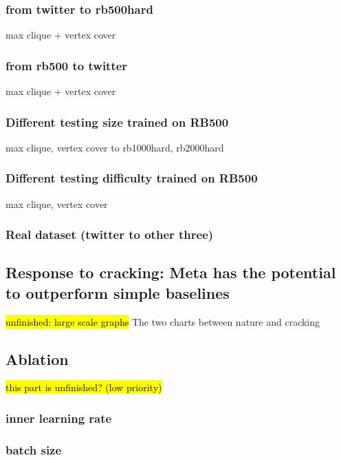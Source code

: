 \subsubsection{from twitter to rb500hard}
max clique + vertex cover
\subsubsection{from rb500 to twitter}
max clique + vertex cover
\subsubsection{Different testing size trained on RB500}
max clique, vertex cover to rb1000hard, rb2000hard
\subsubsection{Different testing difficulty trained on RB500}
max clique, vertex cover
\subsubsection{Real dataset (twitter to other three)}
\subsection{Response to cracking: Meta has the potential to outperform simple baselines}
\hl{unfinished: large scale graphs}
The two charts between nature and cracking

\subsection{Ablation}
\hl{this part is unfinished? (low priority)}
\subsubsection{inner learning rate}
\subsubsection{batch size}



